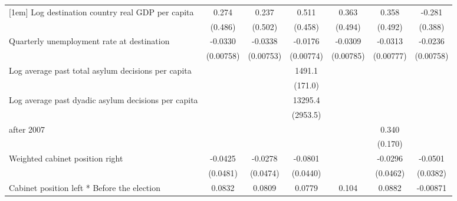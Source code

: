 \begin{table}[htbp]
\begin{tabular}{l*{6}{c}}
[1em]
Log destination country real GDP per capita&       0.274         &       0.237         &       0.511         &       0.363         &       0.358         &      -0.281         \\
                    &     (0.486)         &     (0.502)         &     (0.458)         &     (0.494)         &     (0.492)         &     (0.388)         \\
[1em]
Quarterly unemployment rate at destination&     -0.0330\sym{***}&     -0.0338\sym{***}&     -0.0176\sym{*}  &     -0.0309\sym{***}&     -0.0313\sym{***}&     -0.0236\sym{**} \\
                    &   (0.00758)         &   (0.00753)         &   (0.00774)         &   (0.00785)         &   (0.00777)         &   (0.00758)         \\
[1em]
Log average past total asylum decisions per capita&                     &                     &      1491.1\sym{***}&                     &                     &                     \\
                    &                     &                     &     (171.0)         &                     &                     &                     \\
[1em]
Log average past dyadic asylum decisions per capita&                     &                     &     13295.4\sym{***}&                     &                     &                     \\
                    &                     &                     &    (2953.5)         &                     &                     &                     \\
[1em]
after 2007          &                     &                     &                     &                     &       0.340         &                     \\
                    &                     &                     &                     &                     &     (0.170)         &                     \\
[1em]
Weighted cabinet position right&     -0.0425         &     -0.0278         &     -0.0801         &                     &     -0.0296         &     -0.0501         \\
                    &    (0.0481)         &    (0.0474)         &    (0.0440)         &                     &    (0.0462)         &    (0.0382)         \\
[1em]
Cabinet position left * Before the election&      0.0832\sym{**} &      0.0809\sym{*}  &      0.0779\sym{*}  &       0.104\sym{**} &      0.0882\sym{**} &    -0.00871         \\

\end{tabular}
\end{table}
